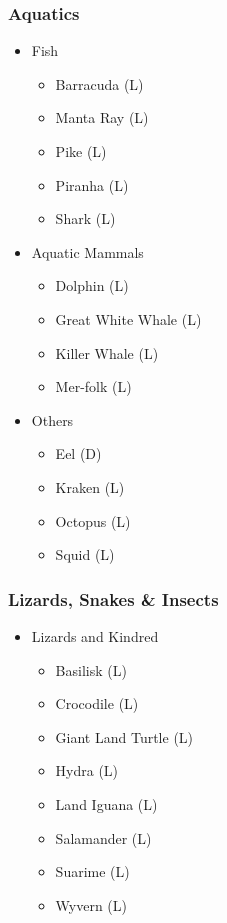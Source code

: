 \begin{multicols}{3}
\subsubsection{Aquatics}

\begin{itemize}
\item Fish
\begin{itemize}
\item Barracuda (L)
\item Manta Ray (L)
\item Pike (L)
\item Piranha (L)
\item Shark (L)
\end{itemize}

\item Aquatic Mammals
\begin{itemize}
\item Dolphin (L)
\item Great White Whale (L)
\item Killer Whale (L)
\item Mer-folk (L)
\end{itemize}

\item Others
\begin{itemize}
\item Eel (D)
\item Kraken (L)
\item Octopus (L)
\item Squid (L)
\end{itemize}
\end{itemize}

\subsubsection{Lizards, Snakes \& Insects}

\begin{itemize}

\item Lizards and Kindred
\begin{itemize}
\item Basilisk (L)
\item Crocodile (L)
\item Giant Land Turtle (L)
\item Hydra (L)
\item Land Iguana (L)
\item Salamander (L)
\item Suarime (L)
\item Wyvern (L)
\end{itemize}


\end{itemize}
\end{multicols}
